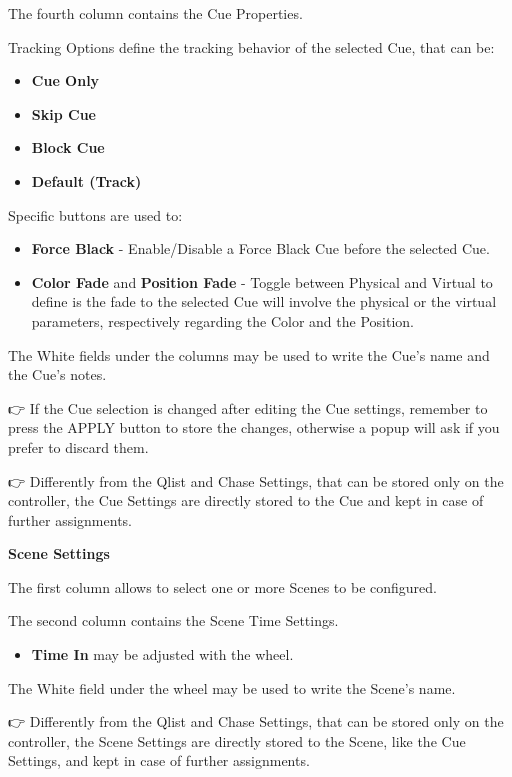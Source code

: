 \documentclass[
]{article}
\providecommand{\tightlist}{%
  \setlength{\itemsep}{0pt}\setlength{\parskip}{0pt}}
\begin{document}
The fourth column contains the Cue Properties.

Tracking Options define the tracking behavior of the selected Cue, that can be:

\begin{itemize}
\item
  \textbf{Cue Only}
\item
  \textbf{Skip Cue}
\item
  \textbf{Block Cue}
\item
  \textbf{Default (Track)}
\end{itemize}

Specific buttons are used to:

\begin{itemize}
\item
  \textbf{Force Black} - Enable/Disable a Force Black Cue before the selected Cue.
\item
  \textbf{Color Fade} and \textbf{Position Fade} - Toggle between Physical and Virtual to define is the fade to the selected Cue will involve the physical or the virtual parameters, respectively regarding the Color and the Position.
\end{itemize}

The White fields under the columns may be used to write the Cue's name and the Cue's notes.

👉 If the Cue selection is changed after editing the Cue settings, remember to press the APPLY button to store the changes, otherwise a popup will ask if you prefer to discard them.

👉 Differently from the Qlist and Chase Settings, that can be stored only on the controller, the Cue Settings are directly stored to the Cue and kept in case of further assignments.

\textbf{Scene Settings}

The first column allows to select one or more Scenes to be configured.

The second column contains the Scene Time Settings.

\begin{itemize}
\tightlist
\item
  \textbf{Time In} may be adjusted with the wheel.
\end{itemize}

The White field under the wheel may be used to write the Scene's name.

👉 Differently from the Qlist and Chase Settings, that can be stored only on the controller, the Scene Settings are directly stored to the Scene, like the Cue Settings, and kept in case of further assignments.
\end{document}
